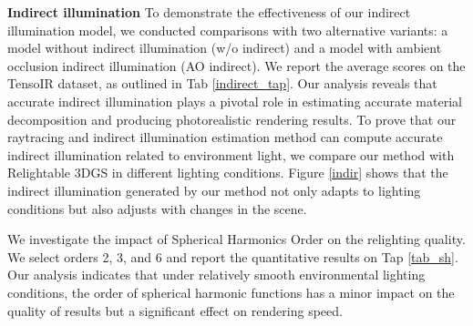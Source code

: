 \textbf{Indirect illumination}
To demonstrate the effectiveness of our indirect illumination model, we conducted comparisons with two alternative variants: a model without indirect illumination (w/o indirect) and a model with ambient occlusion indirect illumination (AO indirect). We report the average scores on the TensoIR dataset, as outlined in Tab \ref{indirect_tap}. Our analysis reveals that accurate indirect illumination plays a pivotal role in estimating accurate material decomposition and producing photorealistic rendering results. To prove that our raytracing and indirect illumination estimation method can compute accurate indirect illumination related to environment light, we compare our method with Relightable 3DGS \cite{gao2023relightable} in different lighting conditions. Figure \ref{indir} shows that the indirect illumination generated by our method not only adapts to lighting conditions but also adjusts with changes in the scene.
\begin{table}[htbp]
 \vspace{-0.3cm}
  \centering
        \caption{Analyses on the impact of indirect illumination. }
         \vspace{-0.3cm}
 \vspace{-0.5cm}
  \label{indirect_tap}%
\end{table}%





 We investigate the impact of Spherical Harmonics Order on the relighting quality. We select orders 2, 3, and 6 and report the quantitative results on Tap \ref{tab_sh}. Our analysis indicates that under relatively smooth environmental lighting conditions, the order of spherical harmonic functions has a minor impact on the quality of results but a significant effect on rendering speed. 

